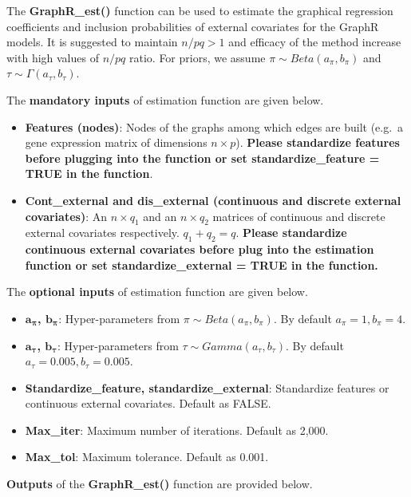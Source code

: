 \documentclass[
]{article}
\begin{document}
The \textbf{GraphR\_est()} function can be used to estimate the
graphical regression coefficients and inclusion probabilities of
external covariates for the GraphR models. It is suggested to maintain
\(n/pq >1\) and efficacy of the method increase with high values of
\(n/pq\) ratio. For priors, we assume \(\pi \sim Beta(a_\pi, b_\pi)\)
and \(\tau \sim \Gamma(a_\tau, b_\tau)\).

The \textbf{mandatory inputs} of estimation function are given below.

\begin{itemize}
\item
  \textbf{Features (nodes)}: Nodes of the graphs among which edges are
  built (e.g.~a gene expression matrix of dimensions \(n \times p\)).
  \textbf{Please standardize features before plugging into the function
  or set standardize\_feature = TRUE in the function}.
\item
  \textbf{Cont\_external and dis\_external (continuous and discrete
  external covariates)}: An \(n \times q_1\) and an \(n \times q_2\)
  matrices of continuous and discrete external covariates respectively.
  \(q_1 + q_2 =q\). \textbf{Please standardize continuous external
  covariates before plug into the estimation function or set
  standardize\_external = TRUE in the function.}
\end{itemize}

The \textbf{optional inputs} of estimation function are given below.

\begin{itemize}
\item
  \textbf{\(\boldsymbol a_{\boldsymbol \pi}\),
  \(\boldsymbol b_{\boldsymbol \pi}\)}: Hyper-parameters from
  \(\pi \sim Beta(a_\pi, b_\pi)\). By default \(a_\pi = 1, b_\pi = 4\).
\item
  \textbf{\(\boldsymbol a_{\boldsymbol \tau}\),
  \(\boldsymbol b_{\boldsymbol \tau}\)}: Hyper-parameters from
  \(\tau \sim Gamma(a_\tau, b_\tau)\). By default
  \(a_\tau = 0.005, b_\tau = 0.005\).
\item
  \textbf{Standardize\_feature, standardize\_external}: Standardize
  features or continuous external covariates. Default as FALSE.
\item
  \textbf{Max\_iter}: Maximum number of iterations. Default as 2,000.
\item
  \textbf{Max\_tol}: Maximum tolerance. Default as 0.001.
\end{itemize}

\textbf{Outputs} of the \textbf{GraphR\_est()} function are provided
below.
\end{document}
